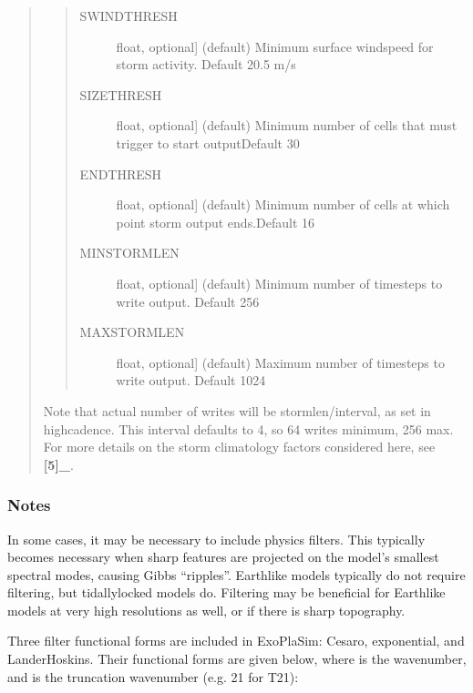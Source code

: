 \documentclass[letterpaper,10pt,english]{sphinxmanual}
\begin{document}
\begin{fulllineitems}
\begin{fulllineitems}
\begin{quote}
\begin{quote}
\begin{description}
\begin{description}
\begin{description}
\item[{SWINDTHRESH}] \leavevmode{[}float, optional{]}
(default) Minimum surface windspeed for storm activity. Default 20.5 m/s

\item[{SIZETHRESH}] \leavevmode{[}float, optional{]}
(default) Minimum number of cells that must trigger to start outputDefault 30

\item[{ENDTHRESH}] \leavevmode{[}float, optional{]}
(default) Minimum number of cells at which point storm output ends.Default 16

\item[{MINSTORMLEN}] \leavevmode{[}float, optional{]}
(default) Minimum number of timesteps to write output. Default 256

\item[{MAXSTORMLEN}] \leavevmode{[}float, optional{]}
(default) Maximum number of timesteps to write output. Default 1024

\end{description}

\end{description}

\end{description}
\end{quote}

Note that actual number of writes will be stormlen/interval, as set in highcadence. This interval defaults to 4, so 64 writes minimum, 256 max. For more details on the storm climatology factors considered here, see {\color{red}\bfseries{}{[}5{]}\_}.
\end{quote}
\subsubsection*{Notes}

In some cases, it may be necessary to include physics filters. This typically becomes
necessary when sharp features are projected on the model’s smallest spectral modes, causing
Gibbs “ripples”. Earth\sphinxhyphen{}like models typically do not require filtering, but tidally\sphinxhyphen{}locked
models do. Filtering may be beneficial for Earth\sphinxhyphen{}like models at very high resolutions as well,
or if there is sharp topography.

Three filter functional forms are included in ExoPlaSim: Cesaro, exponential, and Lander\sphinxhyphen{}Hoskins. Their functional forms are given below, where  is the wavenumber, and  is the
truncation wavenumber (e.g. 21 for T21):


\end{fulllineitems}
\end{fulllineitems}
\end{document}
